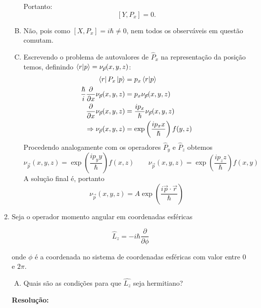 \documentclass[a4paper, 12pt, notitlepage]{article}
\begin{document}
\begin{enumerate}
\begin{enumerate}[(A)]
  Portanto:
  \[
    [Y, P_x] = 0.
  \]
  
  \item Não, pois como $[X, P_x] = i\hbar \neq 0$, nem todos os observáveis em questão comutam.
  
  \item Escrevendo o problema de autovalores de $\hat{P}_x$ na representação da posição temos, definindo $\bra{r}\ket{p} = \nu_{\vec{p}} (x, y, z)$:
  \begin{align*}
  \bra{r}P_x\ket{p} &= p_x \bra{r}\ket{p} \\
  \frac{\hslash}{i} \frac{\partial}{\partial x} \nu_{\vec{p}}(x, y, z) &= p_x \nu_{\vec{p}}(x, y, z) \\
  \frac{\partial}{\partial x} \nu_{\vec{p}}(x, y, z) &= \frac{ip_x}{\hslash} \nu_{\vec{p}}(x, y, z) \\
  \Rightarrow \nu_{\vec{p}}(x, y, z) &= \exp\left(\frac{ip_x x}{\hslash}\right) f(y, z)
  \end{align*}
  Procedendo analogamente com os operadores $\hat{P}_y$ e $\hat{P}_z$ obtemos
  \[ \nu_{\vec{p}}(x, y, z) = \exp \left(\frac{ip_y y}{\hbar}\right)f(x, z) \qquad \nu_{\vec{p}}(x, y, z) = \exp \left(\frac{ip_z z}{\hbar}\right)f(x, y) \]
  A solução final é, portanto
  \[ \nu_{\vec{p}}(x, y, z) = A\exp\left(\frac{i \vec{p} \cdot \vec{r}}{\hbar}\right) \]
  
\end{enumerate}

\item Seja o operador momento angular em coordenadas esféricas

\[ \hat{L}_z = -i\hbar \frac{\partial}{\partial \phi} \]

\noindent onde $\phi$ é a coordenada no sistema de coordenadas esféricas com valor entre $0$ e $2\pi$.

\begin{enumerate}[(A)]
  \item Quais são as condições para que $\hat{L_z}$ seja hermitiano?
\end{enumerate}

\textbf{Resolução: }


\end{enumerate}
\end{document}

